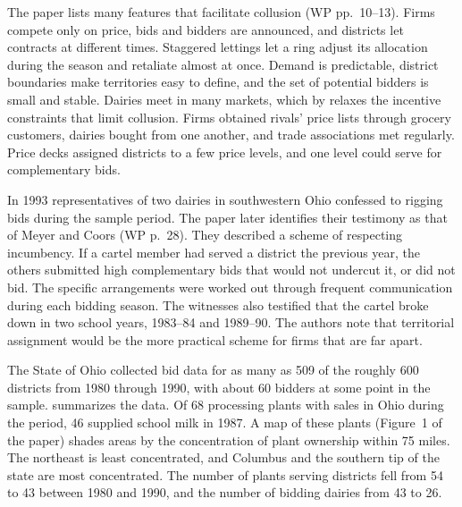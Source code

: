The paper lists many features that facilitate collusion (WP pp.~10--13). Firms compete only on price, bids and
bidders are announced, and districts let contracts at different times. Staggered lettings let a ring adjust its
allocation during the season and retaliate almost at once. Demand is predictable, district boundaries make
territories easy to define, and the set of potential bidders is small and stable. Dairies meet in many markets,
which by \citet{BernheimWhinston1990} relaxes the incentive constraints that limit collusion. Firms obtained rivals'
price lists through grocery customers, dairies bought from one another, and trade associations met regularly. Price
decks assigned districts to a few price levels, and one level could serve for complementary bids.

In 1993 representatives of two dairies in southwestern Ohio confessed to rigging bids during the sample period. The
paper later identifies their testimony as that of Meyer and Coors (WP p.~28). They described a scheme of respecting
incumbency. If a cartel member had served a district the previous year, the others submitted high complementary
bids that would not undercut it, or did not bid. The specific arrangements were worked out through frequent
communication during each bidding season. The witnesses also testified that the cartel broke down in two school
years, 1983--84 and 1989--90. The authors note that territorial assignment would be the more practical scheme for
firms that are far apart.

The State of Ohio collected bid data for as many as 509 of the roughly 600 districts from 1980 through 1990, with
about 60 bidders at some point in the sample.  summarizes the data. Of 68 processing plants
with sales in Ohio during the period, 46 supplied school milk in 1987. A map of these plants (Figure~1 of the paper)
shades areas by the concentration of plant ownership within 75 miles. The northeast is least concentrated, and
Columbus and the southern tip of the state are most concentrated. The number of plants serving districts fell from
54 to 43 between 1980 and 1990, and the number of bidding dairies from 43 to 26.

